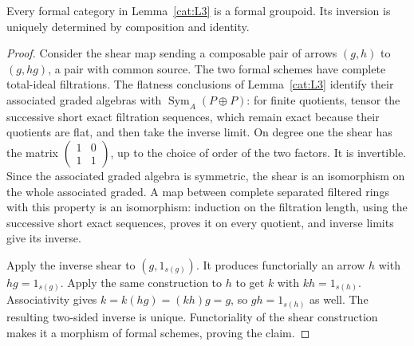 \begin{lemma}\label{cat:L4}
Every formal category in Lemma~\ref{cat:L3} is a formal groupoid.
Its inversion is uniquely determined by composition and identity.
\end{lemma}
\begin{proof}
Consider the shear map sending a composable pair of arrows $(g,h)$ to
$(g,hg)$, a pair with common source.  The two formal schemes have
complete total-ideal filtrations.  The flatness conclusions of
Lemma~\ref{cat:L3} identify their associated graded algebras with
$\operatorname{Sym}_A(P\oplus P)$: for finite quotients, tensor the
successive short exact filtration sequences, which remain exact
because their quotients are flat, and then take the inverse limit.
On degree one the shear has the matrix
$\left(\begin{smallmatrix}1&0\\1&1\end{smallmatrix}\right)$,
up to the choice of order of the two factors.  It is invertible.
Since the associated graded algebra is symmetric, the shear is an
isomorphism on the whole associated graded.  A map between complete
separated filtered rings with this property is an isomorphism: induction
on the filtration length, using the successive short exact sequences,
proves it on every quotient, and inverse limits give its inverse.

Apply the inverse shear to $(g,1_{s(g)})$.  It produces functorially an
arrow $h$ with $hg=1_{s(g)}$.  Apply the same construction to $h$ to
get $k$ with $kh=1_{s(h)}$.  Associativity gives
$k=k(hg)=(kh)g=g$, so $gh=1_{s(h)}$ as well.
The resulting two-sided inverse is unique.  Functoriality of the shear
construction makes it a morphism of formal schemes, proving the claim.
\end{proof}

